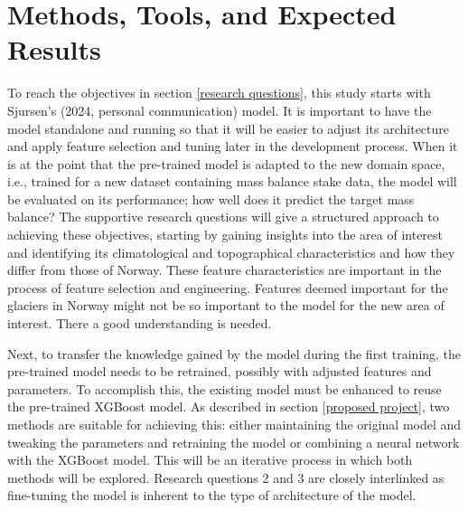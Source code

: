 \section{Methods, Tools, and Expected Results}\label{methodologies}


To reach the objectives in section \ref{research questions}, this study starts with Sjursen's (2024, personal communication) model. It is important to have the model standalone and running so that it will be easier to adjust its architecture and apply feature selection and tuning later in the development process.  When it is at the point that the pre-trained model is adapted to the new domain space, i.e., trained for a new dataset containing mass balance stake data, the model will be evaluated on its performance; how well does it predict the target mass balance? The supportive research questions will give a structured approach to achieving these objectives, starting by gaining insights into the area of interest and identifying its climatological and topographical characteristics and how they differ from those of Norway.  These feature characteristics are important in the process of feature selection and engineering. Features deemed important for the glaciers in Norway might not be so important to the model for the new area of interest. There a good understanding is needed. 

Next, to transfer the knowledge gained by the model during the first training, the pre-trained model needs to be retrained, possibly with adjusted features and parameters. To accomplish this, the existing model must be enhanced to reuse the pre-trained XGBoost model. As described in section \ref{proposed project}, two methods are suitable for achieving this: either maintaining the original model and tweaking the parameters and retraining the model or combining a neural network with the XGBoost model.  This will be an iterative process in which both methods will be explored. Research questions 2 and 3 are closely interlinked as fine-tuning the model is inherent to the type of architecture of the model.

